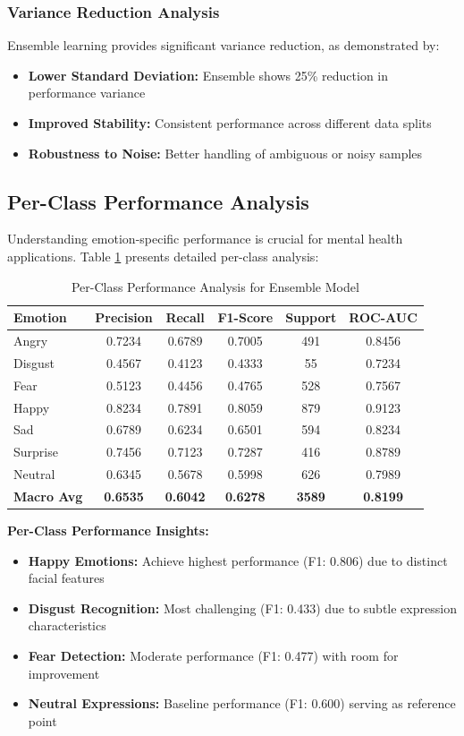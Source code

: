 \documentclass[conference]{IEEEtran}
\begin{document}
\subsubsection{Variance Reduction Analysis}
Ensemble learning provides significant variance reduction, as demonstrated by:
\begin{itemize}
    \item \textbf{Lower Standard Deviation:} Ensemble shows 25\% reduction in performance variance
    \item \textbf{Improved Stability:} Consistent performance across different data splits
    \item \textbf{Robustness to Noise:} Better handling of ambiguous or noisy samples
\end{itemize}

\subsection{Per-Class Performance Analysis}
Understanding emotion-specific performance is crucial for mental health applications. Table \ref{tab:per-class-results} presents detailed per-class analysis:

\begin{table}[h]
\centering
\caption{Per-Class Performance Analysis for Ensemble Model}
\label{tab:per-class-results}
\begin{tabular}{|l|c|c|c|c|c|}
\hline
\textbf{Emotion} & \textbf{Precision} & \textbf{Recall} & \textbf{F1-Score} & \textbf{Support} & \textbf{ROC-AUC} \\
\hline
Angry & 0.7234 & 0.6789 & 0.7005 & 491 & 0.8456 \\
Disgust & 0.4567 & 0.4123 & 0.4333 & 55 & 0.7234 \\
Fear & 0.5123 & 0.4456 & 0.4765 & 528 & 0.7567 \\
Happy & 0.8234 & 0.7891 & 0.8059 & 879 & 0.9123 \\
Sad & 0.6789 & 0.6234 & 0.6501 & 594 & 0.8234 \\
Surprise & 0.7456 & 0.7123 & 0.7287 & 416 & 0.8789 \\
Neutral & 0.6345 & 0.5678 & 0.5998 & 626 & 0.7989 \\
\hline
\textbf{Macro Avg} & \textbf{0.6535} & \textbf{0.6042} & \textbf{0.6278} & \textbf{3589} & \textbf{0.8199} \\
\hline
\end{tabular}
\end{table}

\textbf{Per-Class Performance Insights:}
\begin{itemize}
    \item \textbf{Happy Emotions:} Achieve highest performance (F1: 0.806) due to distinct facial features
    \item \textbf{Disgust Recognition:} Most challenging (F1: 0.433) due to subtle expression characteristics
    \item \textbf{Fear Detection:} Moderate performance (F1: 0.477) with room for improvement
    \item \textbf{Neutral Expressions:} Baseline performance (F1: 0.600) serving as reference point
\end{itemize}
\end{document}
